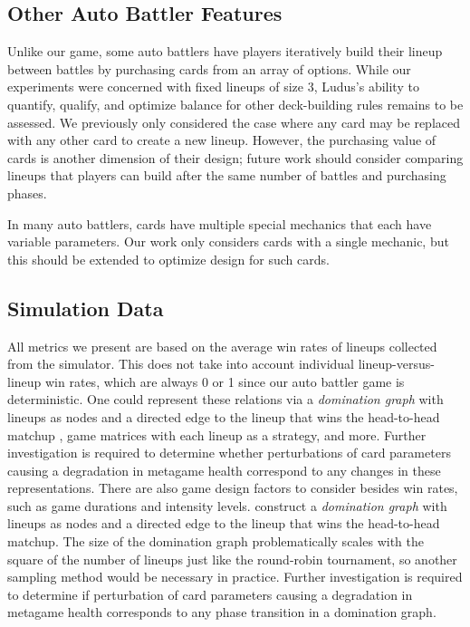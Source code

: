 \documentclass[letterpaper]{article} %
\begin{document}
\subsection{Other Auto Battler Features}


Unlike our game, some auto battlers have
players iteratively build their lineup between battles by purchasing
cards from an array of options. While our experiments were concerned with fixed lineups of size 3, 
{\sc Ludus}'s ability to quantify, qualify, and optimize balance for other deck-building rules %
remains to be assessed. We previously only considered
the case where any card may be replaced with any other card to create a new lineup. However, 
the purchasing value of cards is another dimension of their design; %
future work should consider comparing lineups
that players can build after the same number of battles and purchasing phases.


In many auto battlers, cards have multiple special mechanics that each have variable parameters.
Our work only considers cards with a single mechanic, but this should be extended to optimize design for such cards.


\subsection{Simulation Data}

All metrics we present are based on the average win rates of lineups collected from the simulator. 
This does not take into account individual lineup-versus-lineup win rates, which are always 0 or 1 since
our auto battler game is deterministic. One could represent these relations via a
\textit{domination graph} with lineups
as nodes and a directed edge to the lineup that wins the head-to-head matchup \cite{gkmmmf_eaai21},
game matrices with each lineup as a strategy, and more.
Further investigation is required to determine whether perturbations of card parameters causing a degradation
in metagame health correspond to any changes in these representations.  There are also game design factors to consider besides win rates, such as game durations and intensity levels.
construct a \textit{domination graph} with lineups
as nodes and a directed edge to the lineup that wins the head-to-head matchup. The size of the domination
graph problematically scales with the square of the number of lineups just like the round-robin tournament,
so another sampling method would be necessary in practice. Further investigation is required to determine if perturbation of card parameters causing a degradation
in metagame health corresponds to any phase transition in a domination graph.
\fi
\end{document}
